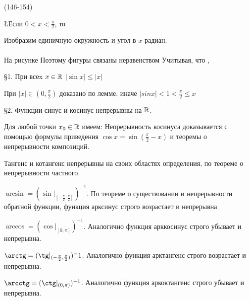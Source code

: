 (146-154)

\L Если $0 < x < \frac \pi2$, то 

\D Изобразим единичную окружность и угол в $x$ радиан.\\
\\
На рисунке  Поэтому фигуры связаны неравенством  Учитывая, что  , 

\S1. При всеx $x \in \mathbb{R}$ $|\sin x| \le |x|$

\D При $|x| \in (0, \frac \pi2)$ доказано по лемме, иначе $|sin x| < 1 < \frac \pi2 \le x$

\S2. Функции синус и косинус непрерывны на $\mathbb{R}$.

\D Для любой точки $x_0 \in \mathbb{R}$ имеем:  Непрерывность косинуса доказывается с помощью формулы приведения $\cos x = \sin (\frac \pi2 - x)$ и теоремы о непрерывности композиций.

Тангенс и котангенс непрерывны на своих областях определения, по теореме о непрерывности частного.

$\arcsin = (\sin|_{[-\frac \pi2, \frac \pi2]})^{-1}$. По теореме о существовании и непрерывности обратной функции, функция арксинус строго возрастает и непрерывна

$\arccos = (\cos|_{[0, \pi]})^{-1}$. Аналогично функция арккосинус строго убывает и непрерывна.

$\arctg = (\tg|_{(-\frac \pi2, \frac \pi2)})^-1$. Аналогично функция арктангенс строго возрастает  и непрерывна.

$\arcctg = (\ctg|_{(0, \pi)})^{-1}$. Аналогично функция аркоктангенс строго убывает и непрерывна.
